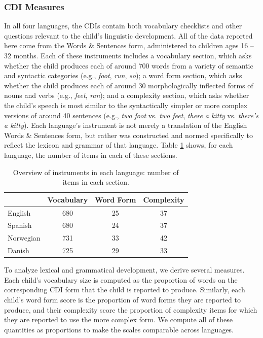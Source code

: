 \documentclass[10pt,letterpaper]{article}
\begin{document}
\subsubsection{CDI Measures}

In all four languages, the CDIs contain both vocabulary checklists and other questions relevant to the child's linguistic development. All of the data reported here come from the Words \& Sentences form, administered to children ages 16 -- 32 months. Each of these instruments includes a vocabulary section, which asks whether the child produces each of around 700 words from a variety of semantic and syntactic categories (e.g., \emph{foot}, \emph{run}, \emph{so}); a word form section, which asks whether the child produces each of around 30 morphologically inflected forms of nouns and verbs (e.g., \emph{feet}, \emph{ran}); and a complexity section, which asks whether the child's speech is most similar to the syntactically simpler or more complex versions of around 40 sentences (e.g., \emph{two foot} vs. \emph{two feet}, \emph{there a kitty} vs. \emph{there's a kitty}). Each language's instrument is not merely a translation of the English Words \& Sentences form, but rather was constructed and normed specifically to reflect the lexicon and grammar of that language. Table \ref{table:measures} shows, for each language, the number of items in each of these sections.

\begin{table}[t]
\begin{center}
\begin{tabular}{lccc}
\hline
& Vocabulary & Word Form & Complexity\\ 
\hline
English & 680 & 25 & 37\\ 
Spanish & 680 & 24 & 37\\ 
Norwegian & 731 & 33 & 42\\ 
Danish & 725 & 29 & 33\\ 
\hline
\end{tabular}
\caption{\label{table:measures} Overview of instruments in each language: number of items in each section.}
\end{center}
\end{table}

To analyze lexical and grammatical development, we derive several measures. Each child's vocabulary size is computed as the proportion of words on the corresponding CDI form that the child is reported to produce. Similarly, each child's word form score is the proportion of word forms they are reported to produce, and their complexity score the proportion of complexity items for which they are reported to use the more complex form. We compute all of these quantities as proportions to make the scales comparable across languages.
\end{document}
